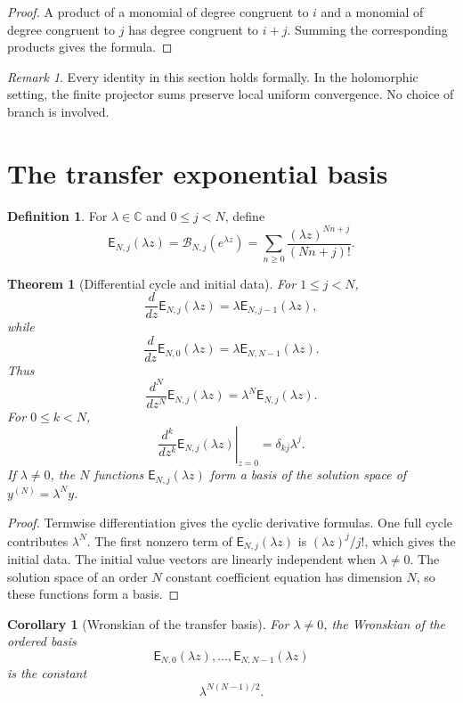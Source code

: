 \documentclass{aomart}
\newtheorem{theorem}{Theorem}[section]
\newtheorem{corollary}[corollary]{Corollary}
\theoremstyle{definition}
\newtheorem{definition}[definition]{Definition}
\theoremstyle{remark}
\newtheorem{remark}[remark]{Remark}
\newcommand{\CC}{\mathbb C}
\newcommand{\Bcal}{\mathcal B}
\newcommand{\Efun}{\mathsf E}
\begin{document}
\begin{proof}
A product of a monomial of degree congruent to $i$ and a monomial of degree congruent to $j$ has degree congruent to $i+j$.  Summing the corresponding products gives the formula.
\end{proof}

\begin{remark}\label{rem:formal_analytic}
Every identity in this section holds formally.  In the holomorphic setting, the finite projector sums preserve local uniform convergence.  No choice of branch is involved.
\end{remark}

\section{The transfer exponential basis}\label{sec:transfer_exponential}

\begin{definition}\label{def:transfer_exponential}
For $\lambda\in\CC$ and $0\leq j<N$, define
\[
\Efun_{N,j}(\lambda z)
=
\Bcal_{N,j}(e^{\lambda z})
=
\sum_{n\geq0}\frac{(\lambda z)^{Nn+j}}{(Nn+j)!}.
\]
\end{definition}

\begin{theorem}[Differential cycle and initial data]\label{thm:exponential_cycle}
For $1\leq j<N$,
\[
\frac{d}{dz}\Efun_{N,j}(\lambda z)
=
\lambda\Efun_{N,j-1}(\lambda z),
\]
while
\[
\frac{d}{dz}\Efun_{N,0}(\lambda z)
=
\lambda\Efun_{N,N-1}(\lambda z).
\]
Thus
\[
\frac{d^N}{dz^N}\Efun_{N,j}(\lambda z)
=
\lambda^N\Efun_{N,j}(\lambda z).
\]
For $0\leq k<N$,
\[
\left.\frac{d^k}{dz^k}\Efun_{N,j}(\lambda z)\right|_{z=0}
=
\delta_{kj}\lambda^j.
\]
If $\lambda\ne0$, the $N$ functions $\Efun_{N,j}(\lambda z)$ form a basis of the solution space of $y^{(N)}=\lambda^Ny$.
\end{theorem}

\begin{proof}
Termwise differentiation gives the cyclic derivative formulas.  One full cycle contributes $\lambda^N$.  The first nonzero term of $\Efun_{N,j}(\lambda z)$ is $(\lambda z)^j/j!$, which gives the initial data.  The initial value vectors are linearly independent when $\lambda\ne0$.  The solution space of an order $N$ constant coefficient equation has dimension $N$, so these functions form a basis.
\end{proof}


\begin{corollary}[Wronskian of the transfer basis]\label{cor:wronskians}
For $\lambda\ne0$, the Wronskian of the ordered basis
\[
\Efun_{N,0}(\lambda z),\ldots,\Efun_{N,N-1}(\lambda z)
\]
is the constant
\[
\lambda^{N(N-1)/2}.
\]
\end{corollary}
\end{document}
